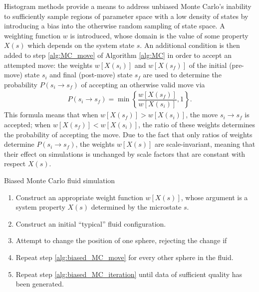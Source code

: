 \documentclass[11pt]{article}
\newcommand{\f}[2]{\dfrac{#1}{#2}} %
\newcommand{\p}[1]{\left(#1\right)} %
\renewcommand{\sp}[1]{\left[#1\right]} %
\renewcommand{\set}[1]{\left\{#1\right\}} %
\newenvironment{alg}
{\hrulefill\begin{enumerate}}
{\end{enumerate}\hrulefill}
\begin{document}
Histogram methods provide a means to address unbiased Monte Carlo's
inability to sufficiently sample regions of parameter space with a low
density of states by introducing a bias into the otherwise random
sampling of state space. A weighting function $w$ is introduced, whose
domain is the value of some property $X\p{s}$ which depends on the
system state $s$. An additional condition is then added to step
\ref{alg:MC_move} of Algorithm \ref{alg:MC} in order to accept an
attempted move: the weights $w\sp{X\p{s_i}}$ and $w\sp{X\p{s_f}}$ of
the initial (pre-move) state $s_i$ and final (post-move) state $s_f$
are used to determine the probability $P\p{s_i\to s_f}$ of accepting
an otherwise valid move via
\begin{align}
  P\p{s_i\to s_f}=\min\set{\f{w\sp{X\p{s_f}}}{w\sp{X\p{s_i}}},1}.
  \label{eq:move_prob}
\end{align}
This formula means that when $w\sp{X\p{s_f}}>w\sp{X\p{s_i}}$, the move
$s_i\to s_f$ is accepted; when $w\sp{X\p{s_f}}<w\sp{X\p{s_i}}$, the
ratio of these weights determines the probability of accepting the
move. Due to the fact that only ratios of weights determine
$P\p{s_i\to s_f}$, the weights $w\sp{X\p{s}}$ are scale-invariant,
meaning that their effect on simulations is unchanged by scale factors
that are constant with respect $X\p{s}$.

\begin{algorithm}
  \caption{Biased Monte Carlo fluid simulation}
  \label{alg:biased_MC}
  \begin{alg}

  \item Construct an appropriate weight function $w\sp{X\p{s}}$, whose
    argument is a system property $X\p{s}$ determined by the
    microstate $s$.

  \item Construct an initial ``typical'' fluid configuration.

  \item Attempt to change the position of one sphere, rejecting the
    change if
    \label{alg:biased_MC_move}

  \item Repeat step \ref{alg:biased_MC_move} for every other sphere in
    the fluid.
    \label{alg:biased_MC_iteration}

  \item Repeat step \ref{alg:biased_MC_iteration} until data of
    sufficient quality has been generated.

  \end{alg}
\end{algorithm}
\end{document}
